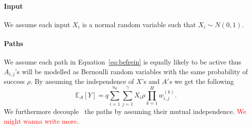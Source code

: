 \documentclass[twoside]{article}
\begin{document}
\paragraph{Input}
We assume each input $X_i$ is a normal random variable such that $X_i\sim N(0,1)$. 

\paragraph{Paths}
We assume each path in Equation~\ref{eq:befrein} is equally likely to be active thus $A_{i,j}$'s will be modelled as Bernoulli random variables with the same probability of success $\rho$. By assuming the independence of $X$'s and $A's$ we get the following
\begin{equation}
\mathbb{E}_A[Y] = q\sum_{i=1}^{n_0}\sum_{j = 1}^\gamma X_{i}\rho\prod_{k = 1}^{H}w_{i,j}^{(k)}.
\label{eq:befrein2}
\end{equation}
We furthermore decouple~\cite{opac-b1095246} the paths by assuming their mutual independence. \textcolor{red}{We might wanna write more.}
\end{document}
